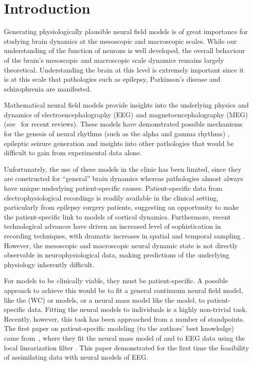 \documentclass[review,authoryear,3p]{elsarticle}
\begin{document}
\section{Introduction}

Generating physiologically plausible neural field models is of great importance for studying brain dynamics at the mesoscopic and macroscopic scales. While our understanding of the function of neurons is well developed, the overall behaviour of the brain's mesoscopic and macroscopic scale dynamics remains largely theoretical. Understanding the brain at this level is extremely important since it is at this scale that pathologies such as epilepsy, Parkinson's disease and schizophrenia are manifested. 

Mathematical neural field models provide insights into the underlying physics and dynamics of electroencephalography (EEG) and magnetoencephalography (MEG) (see~\citet{Deco2008,David2003} for recent reviews). These models have demonstrated possible mechanisms for the genesis of neural rhythms (such as the alpha and gamma rhythms) \citep{Liley1999,RENNIE2000}, epileptic seizure generation \citep{DaSilva2003,Suffczynski2004,Wendling2005} and insights into other pathologies \citep{Moran2008,Schiff2009} that would be difficult to gain from experimental data alone. 

Unfortunately, the use of these models in the clinic has been limited, since they are constructed for ``general'' brain dynamics whereas pathologies almost always have unique underlying patient-specific causes. Patient-specific data from electrophysiological recordings is readily available in the clinical setting, particularly from epilepsy surgery patients, suggesting an opportunity to make the patient-specific link to models of cortical dynamics. Furthermore, recent technological advances have driven an increased level of sophistication in recording techniques, with dramatic increases in spatial and temporal sampling \citep{Brinkmann2009}. However, the mesoscopic and macroscopic neural dynamic state is not directly observable in neurophysiological data, making predictions of the underlying physiology inherently difficult.

For models to be clinically viable, they must be patient-specific. A possible approach to achieve this would be to fit a general continuum neural field model, like the \citet{Wilson1973} (WC) or \citet{Amari1977} models, or a neural mass model like the \citet{Jansen1995} model, to patient-specific data. Fitting the neural models to individuals is a highly non-trivial task. Recently, however, this task has been approached from a number of standpoints. The first paper on patient-specific modeling (to the authors' best knowledge) came from~\citet{Valdes1999}, where they fit the neural mass model of \citet{LopesDaSilva1976} and \citet{Zetterberg1978} to EEG data using the local linearization filter \citep{Ozaki1993,Ozaki1994,Ozaki2000}. This paper demonstrated for the first time the feasibility of assimilating data with neural models of EEG.
\end{document}
